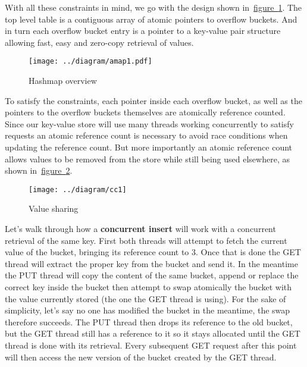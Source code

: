 With all these constraints in mind, we go with the design shown
in~\hyperref[fig:hashmap]{figure~\ref{fig:hashmap}}. The top level
table is a contiguous array of atomic pointers to overflow
buckets. And in turn each overflow bucket entry is a pointer to a
key-value pair structure allowing fast, easy and zero-copy retrieval
of values.

\begin{figure}[htb!]
  \texttt{[image: ../diagram/amap1.pdf]}
  \caption{Hashmap overview}
  \label{fig:hashmap}
\end{figure}

To satisfy the constraints, each pointer inside each overflow bucket,
as well as the pointers to the overflow buckets themselves are
atomically reference counted. Since our key-value store will use many
threads working concurrently to satisfy requests an atomic reference
count is necessary to avoid race conditions when updating the
reference count. But more importantly an atomic reference count allows
values to be removed from the store while still being used elsewhere,
as shown
in~\hyperref[fig:value-sharing]{figure~\ref{fig:value-sharing}}.

\begin{figure}[htb!]
  \texttt{[image: ../diagram/cc1]}
  \caption{Value sharing}
  \label{fig:value-sharing}
\end{figure}


Let's walk through how a \textbf{concurrent insert} will work with a
concurrent retrieval of the same key. First both threads will attempt
to fetch the current value of the bucket, bringing its reference count
to 3. Once that is done the GET thread will extract the proper key
from the bucket and send it. In the meantime the PUT thread will copy
the content of the same bucket, append or replace the correct key
inside the bucket then attempt to swap atomically the bucket with the
value currently stored (the one the GET thread is using). For the sake
of simplicity, let's say no one has modified the bucket in the
meantime, the swap therefore succeeds. The PUT thread then drops its
reference to the old bucket, but the GET thread still has a reference
to it so it stays allocated until the GET thread is done with its
retrieval. Every subsequent GET request after this point will then
access the new version of the bucket created by the GET thread.

